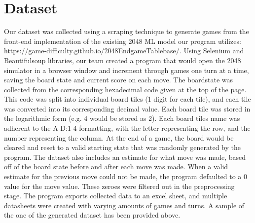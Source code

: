 \documentclass[11pt]{article}
\begin{document}
\section{Dataset}


Our dataset was collected using a scraping technique to generate games from the front-end implementation of the existing 2048 ML model our program utilizes: https://game-difficulty.github.io/2048EndgameTablebase/. Using Selenium and Beautifulsoup libraries, our team created a program that would open the 2048 simulator in a browser window and increment through games one turn at a time, saving the board state and current score on each move. The boardstate was collected from the corresponding hexadecimal code given at the top of the page. This code was split into individual board tiles (1 digit for each tile), and each tile was converted into its corresponding decimal value. Each board tile was stored in the logarithmic form (e.g. 4 would be stored as 2). Each board tiles name was adherent to the A-D:1-4 formatting, with the letter representing the row, and the number representing the column. At the end of a game, the board would be cleared and reset to a valid starting state that was randomly generated by the program. The dataset also includes an estimate for what move was made, based off of the board state before and after each move was made. When a valid estimate for the previous move could not be made, the program defaulted to a 0 value for the move value. These zeroes were filtered out in the preprocessing stage. The program exports collected data to an excel sheet, and multiple datasheets were created with varying amounts of games and turns. A sample of the one of the generated dataset has been provided above.
\end{document}
